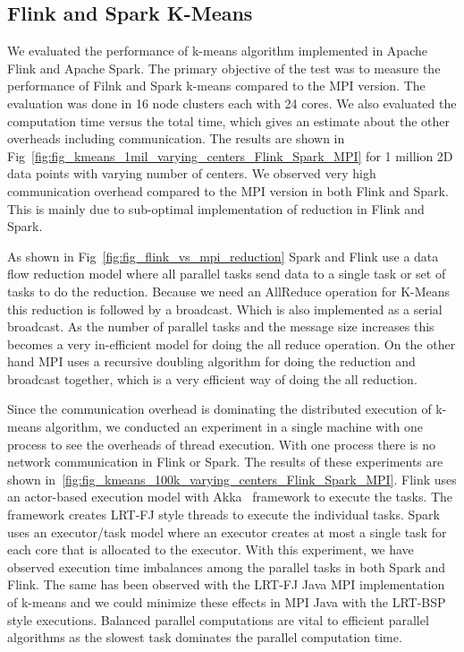 \documentclass[10pt, conference, compsocconf]{IEEEtran}
\begin{document}
\subsection{Flink and Spark K-Means}
We evaluated the performance of k-means algorithm implemented in Apache Flink and Apache Spark. The primary objective of the test was to measure the performance of Filnk and Spark k-means compared to the MPI version. The evaluation was done in 16 node clusters each with 24 cores. We also evaluated the computation time versus the total time, which gives an estimate about the other overheads including communication. The results are shown in Fig~\ref{fig:fig_kmeans_1mil_varying_centers_Flink_Spark_MPI} for 1 million 2D data points with varying number of centers. We observed very high communication overhead compared to the MPI version in both Flink and Spark. This is mainly due to sub-optimal implementation of reduction in Flink and Spark.

As shown in Fig~\ref{fig:fig_flink_vs_mpi_reduction} Spark and Flink use a data flow reduction model where all parallel tasks send data to a single task or set of tasks to do the reduction. Because we need an AllReduce operation for K-Means this reduction is followed by a broadcast. Which is also implemented as a serial broadcast. As the number of parallel tasks and the message size increases this becomes a very in-efficient model for doing the all reduce operation. On the other hand MPI uses a recursive doubling algorithm for doing the reduction and broadcast together, which is a very efficient way of doing the all reduction. 

Since the communication overhead is dominating the distributed execution of k-means algorithm, we conducted an experiment in a single machine with one process to see the overheads of thread execution. With one process there is no network communication in Flink or Spark. The results of these experiments are shown in~\ref{fig:fig_kmeans_100k_varying_centers_Flink_Spark_MPI}. Flink uses an actor-based execution model with Akka~\cite{gupta2012akka} framework to execute the tasks. The framework creates \ac{LRT-FJ} style threads to execute the individual tasks. Spark uses an executor/task model where an executor creates at most a single task for each core that is allocated to the executor. With this experiment, we have observed execution time imbalances among the parallel tasks in both Spark and Flink. The same has been observed with the \ac{LRT-FJ} Java MPI implementation of k-means and we could minimize these effects in MPI Java with the \ac{LRT-BSP} style executions. Balanced parallel computations are vital to efficient parallel algorithms as the slowest task dominates the parallel computation time. 
\end{document}
